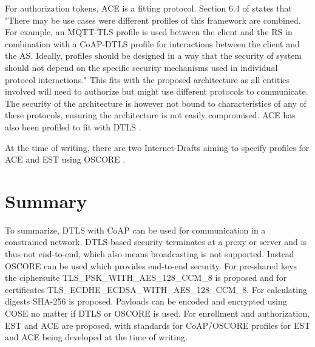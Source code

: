 \documentclass[0-thesis.tex]{subfiles}
\begin{document}
For authorization tokens, ACE is a fitting protocol. Section 6.4 of \parencite{ace} states
that "There may be use cases were different profiles of this framework are combined.  For
example, an MQTT-TLS profile is used between the client and the RS in combination with a
CoAP-DTLS profile for interactions between the client and the AS.  Ideally, profiles
should be designed in a way that the security of system should not depend on the specific
security mechanisms used in individual protocol interactions." This fits with the proposed
architecture as all entities involved will need to authorize but might use different
protocols to communicate. The security of the architecture is however not bound to
characteristics of any of these protocols, ensuring the architecture is not easily
compromised. ACE has also been profiled to fit with DTLS \parencite{ace-dtls-profile}.

At the time of writing, there are two Internet-Drafts aiming to specify profiles for ACE
and EST using OSCORE \parencite{ace-oscore, est-oscore}.

\section{Summary}
To summarize, DTLS with CoAP can be used for communication in a constrained network.
DTLS-based security terminates at a proxy or server and is thus not end-to-end, which also
means broadcasting is not supported. Instead OSCORE can be used which provides end-to-end
security. For pre-shared keys the ciphersuite TLS\_PSK\_WITH\_AES\_128\_CCM\_8{} is
proposed and for certificates TLS\_ECDHE\_ECDSA\_WITH\_AES\_128\_CCM\_8{}. For calculating
digests SHA-256 is proposed. Payloads can be encoded and encrypted using COSE no matter if
DTLS or OSCORE is used. For enrollment and authorization, EST and ACE are proposed, with
standards for CoAP/OSCORE profiles for EST and ACE  being developed at the time of
writing.
\end{document}
